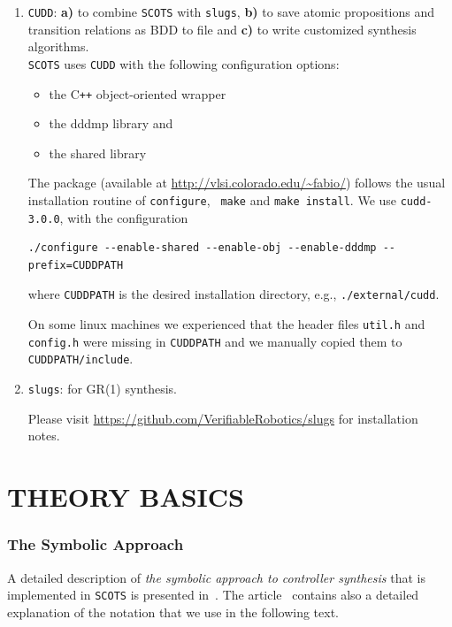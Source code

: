 \documentclass[a4paper]{amsart}
\newcommand\Cpp{C\texttt{++} }
\begin{document}
\begin{enumerate}
  \item
  \label{i:cudd}
  {\tt CUDD}: {\bf  a)} to combine {\tt SCOTS} with {\tt slugs}, {\bf b)} to save atomic propositions
  and transition relations as BDD to file and {\bf c)} to write customized
  synthesis algorithms.\\
  {\tt SCOTS} uses {\tt CUDD} with the following configuration options:
     \begin{itemize}
      \item the \Cpp{} object-oriented wrapper
      \item the dddmp library and
      \item the shared library 
    \end{itemize}
   The package (available at \url{http://vlsi.colorado.edu/~fabio/})
 follows the usual installation routine of {\tt \small configure}, {\tt
   \small make} and
   {\tt \small make install}. We use {\tt \small cudd-3.0.0}, with the
   configuration
  \begin{lstlisting}[basicstyle=\small\ttfamily,frame=none]
  ./configure --enable-shared --enable-obj --enable-dddmp --prefix=CUDDPATH
  \end{lstlisting}
  where {\tt CUDDPATH} is the desired installation directory, e.g., {\tt ./external/cudd}.

  On some linux machines we experienced that the header files {\tt \small util.h} and
  {\tt \small config.h} were missing in {\tt \small CUDDPATH} and we manually
  copied them to {\tt \small CUDDPATH/include}.



  \item {\tt slugs}: for GR(1) synthesis. 
  
  Please visit \url{https://github.com/VerifiableRobotics/slugs} for
  installation notes.


\end{enumerate}




	
\newpage
\part{THEORY BASICS}

\section{The Symbolic Approach}
A detailed description of \emph{the symbolic approach to controller synthesis}
that is implemented in {\tt SCOTS} is presented in~\cite{ReissigWeberRungger15}.
The article~\cite{ReissigWeberRungger15} contains also a detailed explanation of
the notation that we use in the following text.
\end{document}
